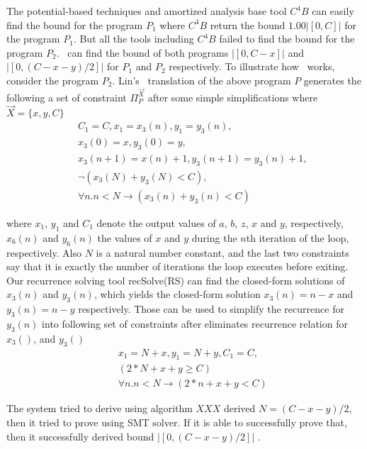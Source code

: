 The potential-based techniques and amortized analysis base tool $C^{4}B$ can easily find the bound for the program $P_1$ where $C^{4}B$ return the bound $1.00 |[0, C]|$ for the program $P_1$. But all the tools including $C^{4}B$ failed to find the bound for the program $P_2$. \SystemName\ can find the bound of both programs $ |[0, C-x]|$ and $ |[0, (C-x-y)/2]|$ for $P_1$ and $P_2$ respectively. To illustrate how \SystemName\ works, consider the program $P_2$. Lin's~\cite{Lin20161} translation of the above program $P$ generates the following a set of constraint $\Pi^{\vec{X}}_{P}$ after some simple simplifications where $\vec{X}=\{x,y,C\}$
\begin{eqnarray*}
	&& C_1=C , x_1 = x_3(n), y_1 = y_3(n), \\
	&& x_3(0) = x, y_3(0) = y, \\
	&& x_3(n+1) = x(n)+1, y_3(n+1) = y_3(n)+1, \\
	&&\neg (x_3(N)+y_3(N)<C), \\
	&& \forall n. n<N\rightarrow (x_3(n)+y_3(n)<C)
\end{eqnarray*}

where  $x_1$, $y_1$ and $C_1$ denote the output values of $a$, $b$, $z$, $x$ and $y$, respectively,
$x_6(n)$ and $y_6(n)$ the values of $x$ and $y$ during the $n$th iteration
of the loop, respectively. Also
$N$ is a natural number constant, and the last two constraints say that it
is exactly the number of iterations the loop executes before exiting. Our recurrence solving tool recSolve(RS) can find the closed-form solutions of $x_3(n)$ and $y_3(n)$, which yields the closed-form solution $x_3(n)=n-x$ and $y_3(n)=n-y$ respectively. Those can be used to simplify the recurrence for $y_3(n)$ into following set of constraints after eliminates recurrence relation for $x_3()$, and $y_3()$
\begin{eqnarray*}
	&& x_1 = N+x, y_1 = N+y, C_1=C,\\
	&& (2*N+x+y \geq C) \\
	&& \forall n. n<N\rightarrow (2*n+x+y<C)
\end{eqnarray*}

The system tried to derive using algorithm $XXX$ derived $N=(C-x-y)/2$, then it tried to prove using SMT solver. If it is able to successfully prove that, then it successfully derived bound $ |[0, (C-x-y)/2]|$ .




